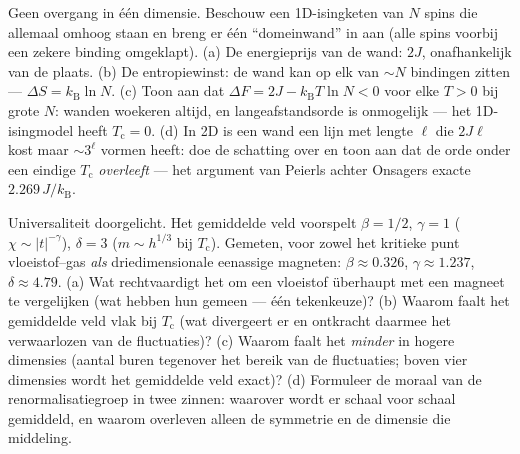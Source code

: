 \begin{exercise}[$\star\star\star$]\label{exo:b3:phase-transitions:10}
Geen overgang in één dimensie. Beschouw een 1D-isingketen van $N$
spins die allemaal omhoog staan en breng er één ``domeinwand'' in aan (alle
spins voorbij een zekere binding omgeklapt). (a) De energieprijs van de wand:
$2J$, onafhankelijk van de plaats. (b) De entropiewinst: de wand kan op
elk van $\sim N$ bindingen zitten --- $\Delta S = k_{\text{B}}\ln N$. (c)
Toon aan dat $\Delta F = 2J - k_{\text{B}}T\ln N < 0$ voor elke $T > 0$ bij
grote $N$: wanden woekeren altijd, en langeafstandsorde is
onmogelijk --- het 1D-isingmodel heeft $T_{\text{c}} = 0$. (d) In
2D is een wand een lijn met lengte $\ell$ die $2J\ell$ kost maar
$\sim3^\ell$ vormen heeft: doe de schatting over en toon aan dat de orde
onder een eindige $T_{\text{c}}$ \emph{overleeft} --- het
argument van Peierls achter Onsagers exacte $2.269\,J/k_{\text{B}}$.
\end{exercise}

\begin{exercise}[$\star\star\star$]\label{exo:b3:phase-transitions:11}
Universaliteit doorgelicht. Het gemiddelde veld voorspelt $\beta = 1/2$, $\gamma
= 1$ ($\chi \sim |t|^{-\gamma}$), $\delta = 3$ ($m \sim h^{1/3}$
bij $T_{\text{c}}$). Gemeten, voor zowel het kritieke punt vloeistof--gas
\emph{als} driedimensionale eenassige magneten: $\beta
\approx 0.326$, $\gamma \approx 1.237$, $\delta \approx 4.79$.
(a) Wat rechtvaardigt het om een vloeistof überhaupt met een magneet te
vergelijken (wat hebben hun  gemeen --- één tekenkeuze)? (b)
Waarom faalt het gemiddelde veld vlak bij $T_{\text{c}}$ (wat divergeert er en
ontkracht daarmee het verwaarlozen van de fluctuaties)? (c) Waarom faalt het
\emph{minder} in hogere dimensies (aantal buren tegenover het
bereik van de fluctuaties; boven vier dimensies wordt het gemiddelde veld
exact)? (d) Formuleer de moraal van de renormalisatiegroep in twee
zinnen: waarover wordt er schaal voor schaal gemiddeld, en waarom overleven
alleen de symmetrie en de dimensie die middeling.
\end{exercise}

